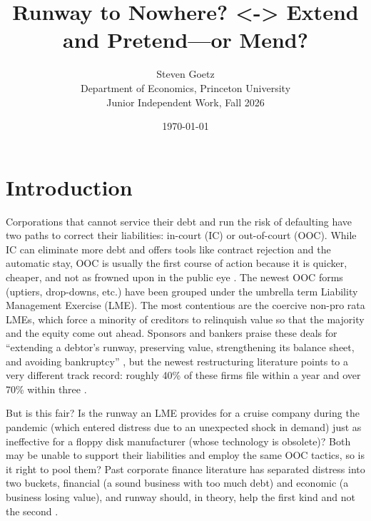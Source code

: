 \documentclass[12pt]{article}
\title{Runway to Nowhere? <-> Extend and Pretend—or Mend?}
\author{Steven Goetz\\ Department of Economics, Princeton University\\
        \small Junior Independent Work, Fall 2026}
\date{\today}
\begin{document}
\maketitle

\begin{abstract}
\noindent [TODO: 150--200 words. Question, data (277 U.S. exchanges 2014--2025: 89 coercive LMEs from Roe \& Rotaru and 188 pro rata distressed exchanges from S\&P), method (a continuous 0--1 structural score built from 70 blind re-codings of each deal's pre-deal rating-agency text; failure within 1/2/3 years; LPMs with year and industry fixed effects), headline results (after a pro rata exchange, going from a pure-shock to a pure-structural firm raises two-year failure by 25 points, $p = 0.02$, smaller and less precise than under the original three-group coding; LMEs fail more often at every score; lenders' terms do not vary with the score), and what it means for lenders' consent.]
\end{abstract}

\section{Introduction}

Corporations that cannot service their debt and run the risk of defaulting have two paths to correct their liabilities: in-court (IC) or out-of-court (OOC). While IC can eliminate more debt and offers tools like contract rejection and the automatic stay, OOC is usually the first course of action because it is quicker, cheaper, and not as frowned upon in the public eye \citep{schwartz1993, altman2019}. The newest OOC forms (uptiers, drop-downs, etc.) have been grouped under the umbrella term Liability Management Exercise (LME). The most contentious are the coercive non-pro rata LMEs, which force a minority of creditors to relinquish value so that the majority and the equity come out ahead. Sponsors and bankers praise these deals for ``extending a debtor's runway, preserving value, strengthening its balance sheet, and avoiding bankruptcy'' \citep[p.~9]{roerotaru2026}, but the newest restructuring literature points to a very different track record: roughly 40\% of these firms file within a year and over 70\% within three \citep{roerotaru2026}.

But is this fair? Is the runway an LME provides for a cruise company during the pandemic (which entered distress due to an unexpected shock in demand) just as ineffective for a floppy disk manufacturer (whose technology is obsolete)? Both may be unable to support their liabilities and employ the same OOC tactics, so is it right to pool them? Past corporate finance literature has separated distress into two buckets, financial (a sound business with too much debt) and economic (a business losing value), and runway should, in theory, help the first kind and not the second \citep{wruck1990, andrade1998}.
\end{document}
